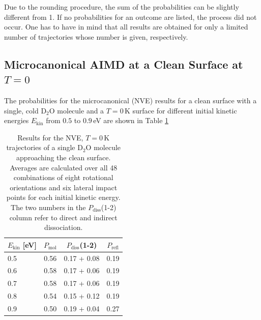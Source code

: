 \documentclass[11pt,DIV=13,BCOR=5mm,a4paper,headinclude]{scrbook}
\begin{document}
Due to the rounding procedure, the sum of the probabilities can be slightly different from 1.
If no probabilities for an outcome are listed, the process did not occur.
One has to have in mind that all results are obtained for only a limited number of trajectories whose number is given, respectively.


\subsection{Microcanonical AIMD at a Clean Surface at $T=0$}
The probabilities for the microcanonical (NVE) results for a clean surface with a single, cold D$_2$O molecule and a $T=0\,$K surface for different initial kinetic energies $E_\textrm{kin}$ from $0.5$ to $0.9\,$eV are shown in Table \ref{tab:mic_ekin}

\begin{table}[!h]
 \centering
  \caption{Results for the NVE, $T=0\,$K trajectories of a single D$_2$O molecule approaching the clean surface.
Averages are calculated over all 48 combinations of eight rotational orientations and six lateral impact points for each initial kinetic energy. The two numbers in the $P_\textrm{diss}$(1-2) column refer to direct and indirect dissociation.}
%
 \begin{tabular}{l|ccc}
\toprule
 $E_\textrm{kin}$ [eV]&$P_\textrm{mol}$ & $P_\textrm{diss}$(1-2) & $P_\textrm{refl}$ \\\midrule
 0.5 & 0.56& 0.17 + 0.08& 0.19\\
 0.6 & 0.58& 0.17 + 0.06& 0.19\\
 0.7 & 0.58& 0.17 + 0.06& 0.19\\
 0.8 & 0.54& 0.15 + 0.12& 0.19\\
 0.9 & 0.50& 0.19 + 0.04& 0.27\\\bottomrule
\end{tabular}
 \label{tab:mic_ekin}
\end{table}
%
\end{document}
